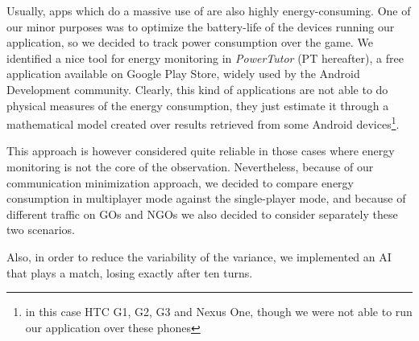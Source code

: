 Usually, apps which do a massive use of \wifi{} are also highly energy-consuming. One of our minor purposes was to optimize the battery-life of the devices running our application, so we decided to track power consumption over the game. We identified a nice tool for energy monitoring in \textit{PowerTutor} (PT hereafter), a free application available on Google Play Store, widely used by the Android Development community. Clearly, this kind of applications are not able to do physical measures of the energy consumption, they just estimate it through a mathematical model created over results retrieved from some Android devices\footnote{in this case HTC G1, G2, G3 and Nexus One, though we were not able to run our application over these phones}.

This approach is however considered quite reliable in those cases where energy monitoring is not the core of the observation. Nevertheless, because of our communication minimization approach, we decided to compare energy consumption in multiplayer mode against the single-player mode, and because of different traffic on GOs and NGOs we also decided to consider separately these two scenarios.

Also, in order to reduce the variability of the variance, we implemented an AI
that plays a match, losing exactly after ten turns.
